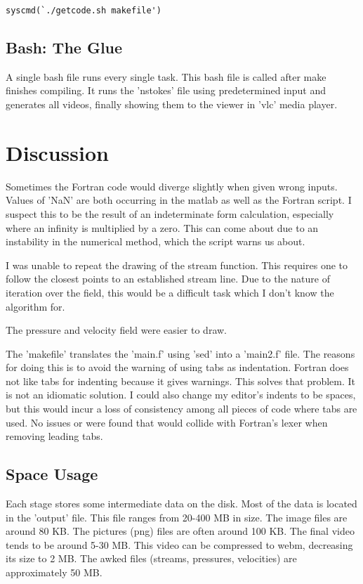 \documentclass[listof=totoc]{report}
\begin{document}
\begin{verbatim}
syscmd(`./getcode.sh makefile')
\end{verbatim}

\section{Bash: The Glue}
A single bash file runs every single task. This bash file is called after make finishes compiling. It runs the 'nstokes' file using predetermined input and generates all videos, finally showing them to the viewer in 'vlc' media player.

\chapter{Discussion}
Sometimes the Fortran code would diverge slightly when given wrong inputs. Values of 'NaN' are both occurring in the matlab as well as the Fortran script. I suspect this to be the result of an indeterminate form calculation, especially where an infinity is multiplied by a zero. This can come about due to an instability in the numerical method, which the script warns us about.

I was unable to repeat the drawing of the stream function. This requires one to follow the closest points to an established stream line. Due to the nature of iteration over the field, this would be a difficult task which I don't know the algorithm for.

The pressure and velocity field were easier to draw.

The 'makefile' translates the 'main.f' using 'sed' into a 'main2.f' file. The reasons for doing this is to avoid the warning of using tabs as indentation. Fortran does not like tabs for indenting because it gives warnings. This solves that problem. It is not an idiomatic solution. I could also change my editor's indents to be spaces, but this would incur a loss of consistency among all pieces of code where tabs are used. No issues or were found that would collide with Fortran's lexer when removing leading tabs.

\section{Space Usage}
Each stage stores some intermediate data on the disk. Most of the data is located in the 'output' file. This file ranges from 20-400 MB in size. The image files are around 80 KB. The pictures (png) files are often around 100 KB. The final video tends to be around 5-30 MB. This video can be compressed to webm, decreasing its size to 2 MB. The awked files (streams, pressures, velocities) are approximately 50 MB.
\end{document}
